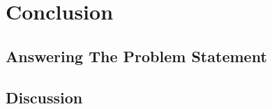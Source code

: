 \chapter{Conclusion}\label{ch:conclusion}

\section{Answering The Problem Statement}

\section{Discussion}